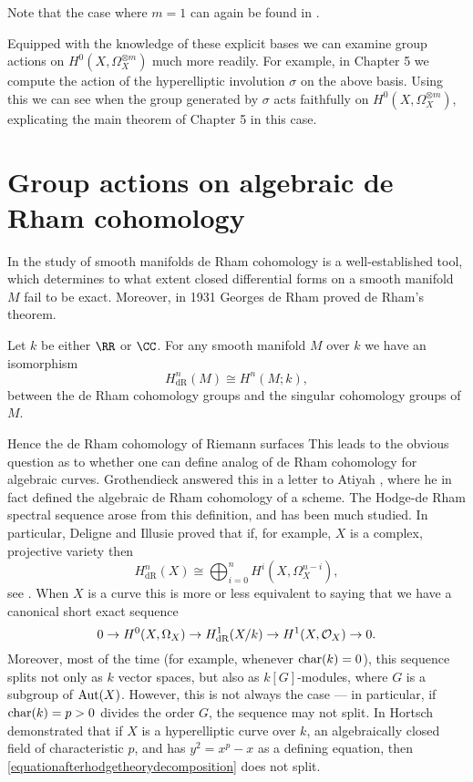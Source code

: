 Note that the case where $m=1$ can again be found in \cite[Prop. 7.4.26]{liu}.

Equipped with the knowledge of these explicit bases we can examine group actions on $H^0(X,\Omega_X^{\otimes m})$ much more readily.
For example, in Chapter 5 we compute the action of the hyperelliptic involution $\sigma$ on the above basis.
Using this we can see when the group generated by $\sigma$ acts faithfully on $H^0(X,\Omega_X^{\otimes m})$, explicating the main theorem of Chapter 5 in this case.

\section{Group actions on algebraic de Rham cohomology}

In the study of smooth manifolds de Rham cohomology is a well-established tool, which determines to what extent closed differential forms on a smooth manifold $M$ fail to be exact.
Moreover, in 1931 Georges de Rham \cite{derhamstheorem} proved de Rham's theorem.
    \begin{unnumthm}
    Let $k$ be either $\RR$ or $\CC$.
    For any smooth manifold $M$ over $k$ we have an isomorphism
        \[
        H^n_{\text{dR}}(M) \cong H^n(M;k),
        \]
    between the de Rham cohomology groups and the singular cohomology groups of $M$.
    \end{unnumthm}

Hence the de Rham cohomology of Riemann surfaces
This leads to the obvious question as to whether one can define analog of de Rham cohomology for algebraic curves.
Grothendieck answered this in a letter to Atiyah \cite{grothendiecklettertoatiyah}, where he in fact defined the algebraic de Rham cohomology of a scheme.
The Hodge-de Rham spectral sequence arose from this definition, and has been much studied.
In particular, Deligne and Illusie proved that if, for example, $X$ is a complex, projective variety then
    \begin{equation*}
    H^n_{\text{dR}}(X) \cong \bigoplus_{i=0}^n H^i(X,\Omega_X^{n-i}),
    \end{equation*}
see \cite{deligneillusie}.
When $X$ is a curve this is more or less equivalent to saying that we have a canonical short exact sequence
    \begin{equation}\label{equationafterhodgetheorydecomposition}
    0 \rightarrow {H^0(X,\Omega_X)} \rightarrow H_{\text {dR}}^1(X/k) \rightarrow H^1(X,\mathcal{O}_X) \rightarrow 0.
    \end{equation}
Moreover, most of the time (for example, whenever $\operatorname{char}(k) = 0$), this sequence splits not only as $k$ vector spaces, but also as $k[G]$-modules, where $G$ is a subgroup of $\operatorname{Aut}(X)$.
However, this is not always the case --- in particular, if $\operatorname{char}(k) = p >0$ divides the order $G$, the sequence may not split.
In \cite{canonicalrepresentation} Hortsch demonstrated that if $X$ is a hyperelliptic curve over $k$, an algebraically closed field of characteristic $p$, and has $y^2 = x^p-x$ as a defining equation, then \eqref{equationafterhodgetheorydecomposition} does not split.

